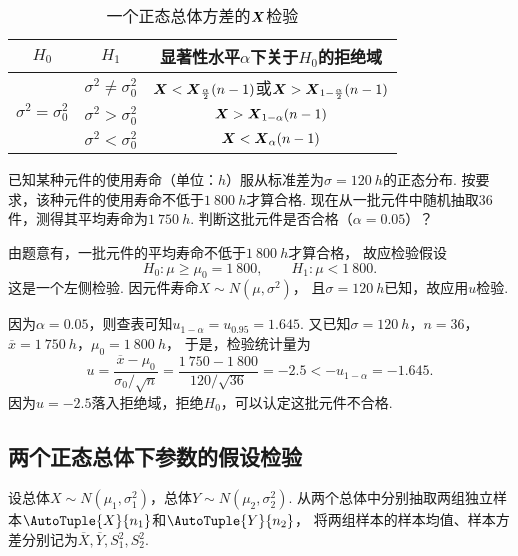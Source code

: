 \begin{table}[htb]
	\centering
	\begin{tabular}{c*2{|c}}
		\hline
		\(H_0\) & \(H_1\) & 显著性水平\(\alpha\)下关于\(H_0\)的拒绝域 \\ \hline
		 & \(\sigma^2\neq\sigma_0^2\)
		& \(\boldsymbol{X}<\boldsymbol{X}_{\frac{\alpha}{2}}(n-1)\)或\(\boldsymbol{X}>\boldsymbol{X}_{1-\frac{\alpha}{2}}(n-1)\) \\ 
		& \(\sigma^2>\sigma_0^2\)
		& \(\boldsymbol{X}>\boldsymbol{X}_{1-\alpha}(n-1)\) \\ 
		& \(\sigma^2<\sigma_0^2\)
		& \(\boldsymbol{X}<\boldsymbol{X}_\alpha(n-1)\) \\
		\hline
	\end{tabular}
	\caption{一个正态总体方差的\(\boldsymbol{X}\)检验}
	\label{table:假设检验.一个正态总体方差的卡方检验}
\end{table}

\begin{example}
已知某种元件的使用寿命（单位：\(h\)）服从标准差为\(\sigma=120\ h\)的正态分布.
按要求，该种元件的使用寿命不低于\(1~800\ h\)才算合格.
现在从一批元件中随机抽取36件，测得其平均寿命为\(1~750\ h\).
判断这批元件是否合格（\(\alpha=0.05\)）？
\begin{solution}
由题意有，一批元件的平均寿命不低于\(1~800\ h\)才算合格，
故应检验假设\[
	H_0: \mu\geq\mu_0=1~800, \qquad
	H_1: \mu<1~800.
\]
这是一个左侧检验.
因元件寿命\(X \sim N(\mu,\sigma^2)\)，
且\(\sigma=120\ h\)已知，故应用\(u\)检验.

因为\(\alpha=0.05\)，则查表可知\(u_{1-\alpha}=u_{0.95}=1.645\).
又已知\(\sigma=120\ h\)，\(n=36\)，\(\overline{x}=1~750\ h\)，\(\mu_0=1~800\ h\)，
于是，检验统计量为\[
	u = \frac{\overline{x}-\mu_0}{\sigma_0/\sqrt{n}}
	= \frac{1~750-1~800}{120/\sqrt{36}}
	= -2.5 < -u_{1-\alpha} = -1.645.
\]
因为\(u=-2.5\)落入拒绝域，拒绝\(H_0\)，可以认定这批元件不合格.
\end{solution}
\end{example}

\subsection{两个正态总体下参数的假设检验}
设总体\(X \sim N(\mu_1,\sigma_1^2)\)，总体\(Y \sim N(\mu_2,\sigma_2^2)\).
从两个总体中分别抽取两组独立样本\(\AutoTuple{X}{n_1}\)和\(\AutoTuple{Y}{n_2}\)，
将两组样本的样本均值、样本方差分别记为\(\overline{X},\overline{Y},S_1^2,S_2^2\).

